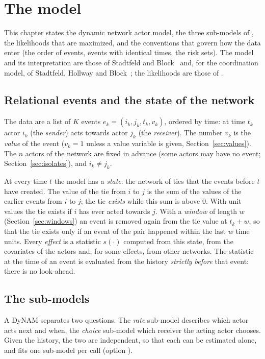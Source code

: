 \chapter{The model}\label{ch:model}

This chapter states the dynamic network actor model, the three sub-models of \nwdynam{}, the likelihoods that are maximized, and the conventions that govern how the data enter (the order of events, events with identical times, the risk sets). The model and its interpretation are those of Stadtfeld and Block~\cite{stadtfeld2017b} and, for the coordination model, of Stadtfeld, Hollway and Block~\cite{stadtfeld2017h}; the likelihoods are those of \goldfish{}.

\section{Relational events and the state of the network}

The data are a list of $K$ events $e_k=(i_k,j_k,t_k,v_k)$, ordered by time: at time $t_k$ actor $i_k$ (the \emph{sender}) acts towards actor $j_k$ (the \emph{receiver}). The number $v_k$ is the \emph{value} of the event ($v_k=1$ unless a value variable is given, Section~\ref{sec:values}). The $n$ actors of the network are fixed in advance (some actors may have no event; Section~\ref{sec:isolates}), and $i_k\neq j_k$.

At every time $t$ the model has a \emph{state}: the network of ties that the events before $t$ have created. The value of the tie from $i$ to $j$ is the sum of the values of the earlier events from $i$ to $j$; the tie \emph{exists} while this sum is above 0. With unit values the tie exists if $i$ has ever acted towards $j$. With a \emph{window} of length $w$ (Section~\ref{sec:windows}) an event is removed again from the tie value at $t_k+w$, so that the tie exists only if an event of the pair happened within the last $w$ time units. Every \emph{effect} is a statistic $s(\cdot)$ computed from this state, from the covariates of the actors and, for some effects, from other networks. The statistic at the time of an event is evaluated from the history \emph{strictly before} that event: there is no look-ahead.

\section{The sub-models}

A DyNAM separates two questions. The \emph{rate} sub-model describes which actor acts next and when, the \emph{choice} sub-model which receiver the acting actor chooses. Given the history, the two are independent, so that each can be estimated alone, and \nwdynam{} fits one sub-model per call (option ).

